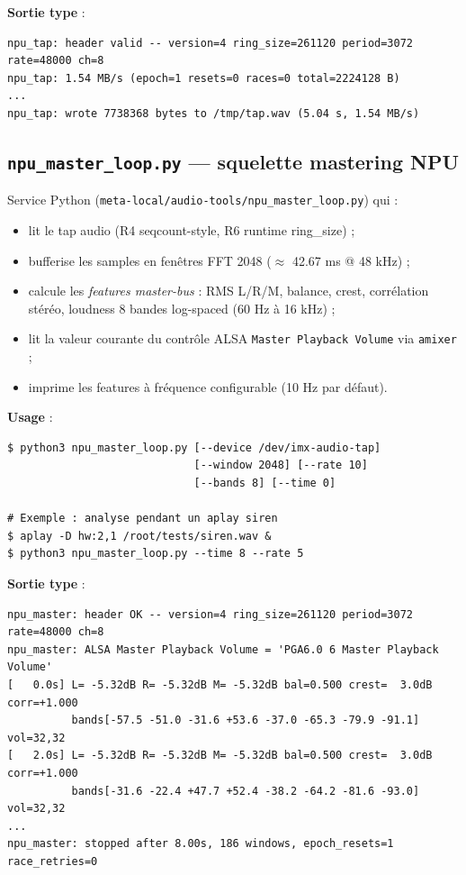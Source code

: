\documentclass[11pt,a4paper]{article}
\begin{document}
\textbf{Sortie type} :
\begin{lstlisting}
npu_tap: header valid -- version=4 ring_size=261120 period=3072 rate=48000 ch=8
npu_tap: 1.54 MB/s (epoch=1 resets=0 races=0 total=2224128 B)
...
npu_tap: wrote 7738368 bytes to /tmp/tap.wav (5.04 s, 1.54 MB/s)
\end{lstlisting}

\subsection{\texttt{npu\_master\_loop.py} — squelette mastering NPU}

Service Python (\texttt{meta-local/audio-tools/npu\_master\_loop.py}) qui :

\begin{itemize}[leftmargin=1.2em]
\item lit le tap audio (R4 seqcount-style, R6 runtime ring\_size) ;
\item bufferise les samples en fenêtres FFT 2048 ($\approx$ 42.67 ms @ 48 kHz) ;
\item calcule les \emph{features master-bus} : RMS L/R/M, balance, crest,
      corrélation stéréo, loudness 8 bandes log-spaced (60 Hz à 16 kHz) ;
\item lit la valeur courante du contrôle ALSA \texttt{Master Playback Volume}
      via \texttt{amixer} ;
\item imprime les features à fréquence configurable (10 Hz par défaut).
\end{itemize}

\textbf{Usage} :
\begin{lstlisting}
$ python3 npu_master_loop.py [--device /dev/imx-audio-tap]
                             [--window 2048] [--rate 10]
                             [--bands 8] [--time 0]

# Exemple : analyse pendant un aplay siren
$ aplay -D hw:2,1 /root/tests/siren.wav &
$ python3 npu_master_loop.py --time 8 --rate 5
\end{lstlisting}

\textbf{Sortie type} :
\begin{lstlisting}
npu_master: header OK -- version=4 ring_size=261120 period=3072 rate=48000 ch=8
npu_master: ALSA Master Playback Volume = 'PGA6.0 6 Master Playback Volume'
[   0.0s] L= -5.32dB R= -5.32dB M= -5.32dB bal=0.500 crest=  3.0dB corr=+1.000
          bands[-57.5 -51.0 -31.6 +53.6 -37.0 -65.3 -79.9 -91.1] vol=32,32
[   2.0s] L= -5.32dB R= -5.32dB M= -5.32dB bal=0.500 crest=  3.0dB corr=+1.000
          bands[-31.6 -22.4 +47.7 +52.4 -38.2 -64.2 -81.6 -93.0] vol=32,32
...
npu_master: stopped after 8.00s, 186 windows, epoch_resets=1 race_retries=0
\end{lstlisting}
\end{document}
